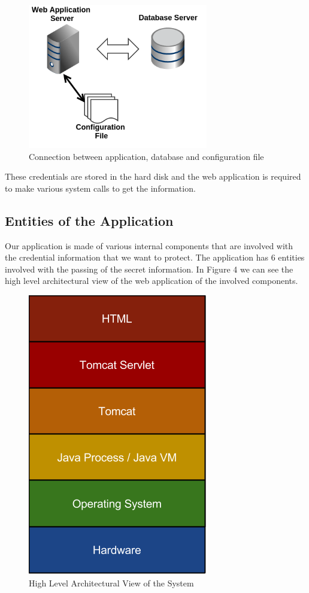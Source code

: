 \documentclass[11pt, a4paper, notitlepage]{article}
\begin{document}
\begin{figure}[h]
    \centering
    \includegraphics[width=0.7\textwidth]{config}
    \caption{Connection between application, database and configuration file}
\end{figure}

These credentials are stored in the hard disk and the web application is required to make various system calls to get the information.

\subsection*{Entities of the Application}
 Our application is made of various internal components that are involved with the credential  information that we want to protect. The application has 6 entities involved with the passing of the secret information. In Figure 4 we can see the high level architectural view of the web application of the involved components. 

\begin{figure}[h!]
    \centering
    \includegraphics[height=0.3\paperheight]{high-level-archecuture}
    \caption{High Level Architectural View of the System}
\end{figure}
\end{document}
